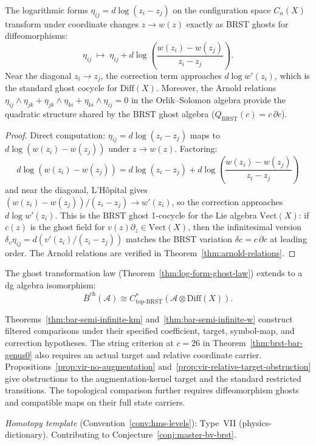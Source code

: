\begin{theorem}
\label{thm:log-form-ghost-law}
The logarithmic forms $\eta_{ij} = d\log(z_i - z_j)$
on the configuration space $C_n(X)$ transform under
coordinate changes $z \to w(z)$ exactly as BRST ghosts
for diffeomorphisms:
\[
\eta_{ij} \;\mapsto\; \eta_{ij}
+ d\log\!\left(\frac{w(z_i) - w(z_j)}{z_i - z_j}\right).
\]
Near the diagonal $z_i \to z_j$, the correction term
approaches $d\log w'(z_i)$, which is the standard ghost
cocycle for $\mathrm{Diff}(X)$.  Moreover, the Arnold
relations
$\eta_{ij} \wedge \eta_{jk} + \eta_{jk} \wedge \eta_{ki}
+ \eta_{ki} \wedge \eta_{ij} = 0$
in the Orlik--Solomon algebra provide the quadratic
structure shared by the BRST ghost algebra
($Q_{\mathrm{BRST}}(c) = c\,\partial c$).
\end{theorem}

\begin{proof}
Direct computation: $\eta_{ij} = d\log(z_i - z_j)$
maps to $d\log(w(z_i) - w(z_j))$ under $z \to w(z)$.
Factoring:
\[
d\log(w(z_i) - w(z_j)) = d\log(z_i - z_j)
+ d\log\!\left(\frac{w(z_i) - w(z_j)}{z_i - z_j}\right)
\]
and near the diagonal, L'H\^opital gives
$(w(z_i) - w(z_j))/(z_i - z_j) \to w'(z_i)$, so
the correction approaches $d\log w'(z_i)$.  This is
the BRST ghost 1-cocycle for the Lie algebra
$\mathrm{Vect}(X)$: if $c(z)$ is the ghost field for
$v(z)\partial_z \in \mathrm{Vect}(X)$, then the
infinitesimal version
$\delta_v \eta_{ij} = d(v'(z_i)/(z_i - z_j))$ matches
the BRST variation $\delta c = c\,\partial c$ at leading
order.  The Arnold relations are verified in
Theorem~\ref{thm:arnold-relations}.
\end{proof}

\begin{conjecture}[Bar complex \texorpdfstring{$=$}{=} topological BRST;
\ClaimStatusConjectured]
\label{conj:bar-topological-brst}
The ghost transformation law
(Theorem~\ref{thm:log-form-ghost-law}) extends to a dg
algebra isomorphism:
\[
\bar{B}^{\mathrm{ch}}(\mathcal{A}) \cong
C^*_{\mathrm{top}\text{-}\mathrm{BRST}}(\mathcal{A}
\otimes \mathrm{Diff}(X)).
\]
\end{conjecture}

\begin{remark}
\label{rem:topological-brst-scope}
Theorems~\ref{thm:bar-semi-infinite-km} and~\ref{thm:bar-semi-infinite-w} construct filtered comparisons under their specified coefficient, target, symbol-map, and correction hypotheses.
The string criterion at $c=26$ in Theorem~\ref{thm:brst-bar-genus0} also requires an actual target and relative coordinate carrier.
Propositions~\ref{prop:vir-no-augmentation} and~\ref{prop:vir-relative-target-obstruction} give obstructions to the augmentation-kernel target and the standard restricted transitions.
The topological comparison further requires diffeomorphism ghosts and compatible maps on their full state carriers.

\emph{Homotopy template} (Convention~\ref{conv:hms-levels}): Type~VII (physics-dictionary).  Contributing to Conjecture~\ref{conj:master-bv-brst}.
\end{remark}

